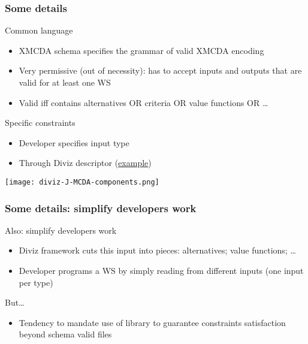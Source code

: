 \documentclass[french,english]{beamer}
\begin{document}
\begin{frame}
	\frametitle{Some details}
	Common language
	\begin{itemize}
		\item XMCDA schema specifies the grammar of valid XMCDA encoding
		\item Very permissive (out of necessity): has to accept inputs and outputs that are valid for at least one \ac{WS}
		\item Valid iff contains alternatives OR criteria OR value functions OR …
	\end{itemize}
	\newlength{\XMSchLeft}
	\setlength{\XMSchLeft}{6cm}
	\begin{minipage}[c]{\XMSchLeft}
		Specific constraints
		\begin{itemize}
			\item Developer specifies input type
			\item Through Diviz descriptor (\href{http://www.decision-deck.org/ws/_downloads/description-wsDD22.xml}{example})
		\end{itemize}
	\end{minipage}%
	\begin{minipage}[c]{\the\columnwidth - \XMSchLeft}
		\texttt{[image: diviz-J-MCDA-components.png]}
	\end{minipage}
\end{frame}

\begin{frame}
	\frametitle{Some details: simplify developers work}
	Also: simplify developers work
	\begin{itemize}
		\item Diviz framework cuts this input into pieces: alternatives; value functions; …
		\item Developer programs a \ac{WS} by simply reading from different inputs (one input per type)
	\end{itemize}
	But…
	\begin{itemize}
		\item Tendency to mandate use of library to guarantee constraints satisfaction beyond schema valid files
	\end{itemize}
\end{frame}
\end{document}
